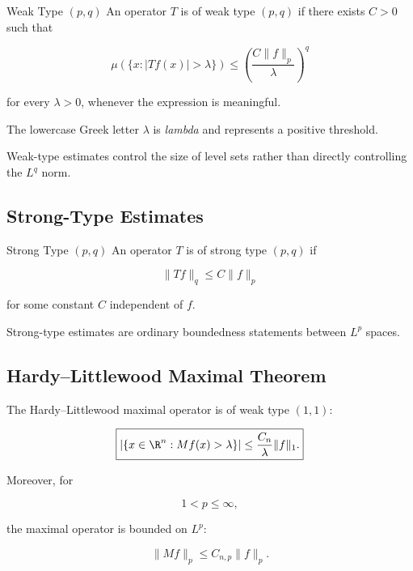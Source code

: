 \begin{definitionbox}{Weak Type \((p,q)\)}
An operator \(T\) is of weak type \((p,q)\) if there exists \(C>0\)
such that

\[
\boxed{
\mu\left(
\{x:|Tf(x)|>\lambda\}
\right)
\leq
\left(
\frac{C\|f\|_p}{\lambda}
\right)^q
}
\]

for every \(\lambda>0\), whenever the expression is meaningful.
\end{definitionbox}

The lowercase Greek letter \(\lambda\) is \emph{lambda} and represents a
positive threshold.

Weak-type estimates control the size of level sets rather than directly
controlling the \(L^q\) norm.

\subsection{Strong-Type Estimates}
\label{subsec:strong-type-estimates}

\begin{definitionbox}{Strong Type \((p,q)\)}
An operator \(T\) is of strong type \((p,q)\) if

\[
\boxed{
\|Tf\|_q
\leq
C\|f\|_p
}
\]

for some constant \(C\) independent of \(f\).
\end{definitionbox}

Strong-type estimates are ordinary boundedness statements between
\(L^p\) spaces.

\subsection{Hardy--Littlewood Maximal Theorem}
\label{subsec:hardy-littlewood-maximal-theorem}

\begin{theorem}
The Hardy--Littlewood maximal operator is of weak type \((1,1)\):

\[
\boxed{
\left|
\{x\in\R^n:Mf(x)>\lambda\}
\right|
\leq
\frac{C_n}{\lambda}
\|f\|_1.
}
\]

Moreover, for

\[
1<p\leq\infty,
\]

the maximal operator is bounded on \(L^p\):

\[
\boxed{
\|Mf\|_p
\leq
C_{n,p}\|f\|_p.
}
\]
\end{theorem}

